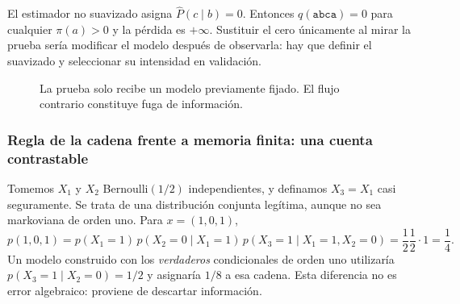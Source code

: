 \begin{ejemplo}
El estimador no suavizado asigna $\widehat P(c\mid b)=0$.
Entonces $q(\texttt{abca})=0$ para cualquier $\pi(a)>0$ y la pérdida
es $+\infty$. Sustituir el cero únicamente al mirar la prueba sería
modificar el modelo después de observarla: hay que definir el suavizado y
seleccionar su intensidad en validación.
\end{ejemplo}

\begin{figure}[H]\centering
{}
\caption{La prueba solo recibe un modelo previamente fijado. El flujo contrario constituye fuga de información.}
\end{figure}

\subsubsection*{Regla de la cadena frente a memoria finita: una cuenta contrastable}

Tomemos $X_1$ y $X_2$ Bernoulli$(1/2)$ independientes, y definamos
$X_3=X_1$ casi seguramente. Se trata de una distribución conjunta legítima,
aunque no sea markoviana de orden uno. Para $x=(1,0,1)$,
\[
 p(1,0,1)=p(X_1=1)\,p(X_2=0\mid X_1=1)\,
 p(X_3=1\mid X_1=1,X_2=0)=\frac12\frac12\cdot1=\frac14.
\]
Un modelo construido con los \emph{verdaderos} condicionales de orden uno
utilizaría $p(X_3=1\mid X_2=0)=1/2$ y asignaría $1/8$ a esa cadena.
Esta diferencia no es error algebraico: proviene de descartar información.

